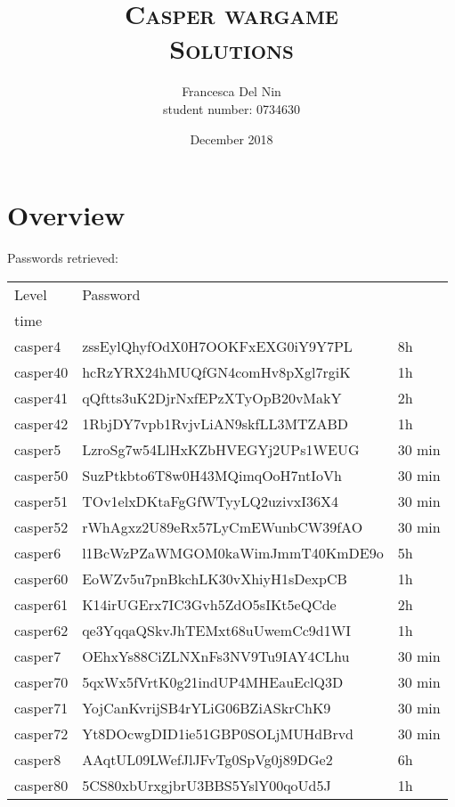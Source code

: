 \documentclass[a4paper,12pt]{article}
\title{\scshape Casper wargame \\ Solutions}
\author{Francesca Del Nin \\ student number: 0734630}
\date{December 2018}
\begin{document}
\maketitle

\tableofcontents

\newpage
\section{Overview}
Passwords retrieved:
\begin{table}[H]
\centering
\begin{tabularx}{\linewidth} {l|l|l}
 Level & Password  &  \begin{tabular}{@{}c@{}}Approximate \\ time\end{tabular} \\
 \hline
 casper4 & zssEylQhyfOdX0H7OOKFxEXG0iY9Y7PL &  8h \\
 casper40 & hcRzYRX24hMUQfGN4comHv8pXgl7rgiK & 1h \\
 casper41 & qQftts3uK2DjrNxfEPzXTyOpB20vMakY & 2h \\
 casper42 & 1RbjDY7vpb1RvjvLiAN9skfLL3MTZABD & 1h \\
 \hline
 casper5 & LzroSg7w54LlHxKZbHVEGYj2UPs1WEUG & 30 min \\
 casper50 & SuzPtkbto6T8w0H43MQimqOoH7ntIoVh & 30 min\\
 casper51 & TOv1elxDKtaFgGfWTyyLQ2uzivxI36X4 & 30 min\\
 casper52 & rWhAgxz2U89eRx57LyCmEWunbCW39fAO & 30 min\\
 \hline
 casper6 & l1BcWzPZaWMGOM0kaWimJmmT40KmDE9o & 5h \\ 
 casper60 & EoWZv5u7pnBkchLK30vXhiyH1sDexpCB & 1h\\
 casper61 & K14irUGErx7IC3Gvh5ZdO5sIKt5eQCde & 2h \\ 
 casper62 & qe3YqqaQSkvJhTEMxt68uUwemCc9d1WI & 1h \\ 
 \hline
 casper7 & OEhxYs88CiZLNXnFs3NV9Tu9IAY4CLhu & 30 min\\ 
 casper70 & 5qxWx5fVrtK0g21indUP4MHEauEclQ3D & 30 min \\
 casper71 & YojCanKvrijSB4rYLiG06BZiASkrChK9 & 30 min\\              casper72 & Yt8DOcwgDID1ie51GBP0SOLjMUHdBrvd &  30 min\\
 \hline
 casper8 & AAqtUL09LWefJlJFvTg0SpVg0j89DGe2 & 6h \\ 
 casper80 & 5CS80xbUrxgjbrU3BBS5YslY00qoUd5J &  1h \\

\end{tabularx}
\end{table}
\end{document}

